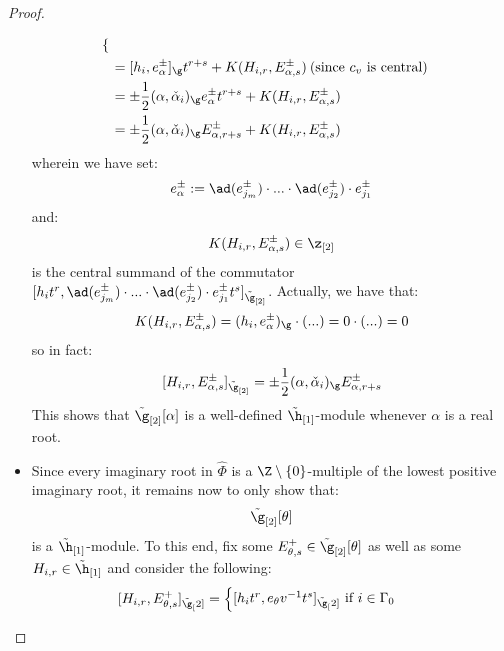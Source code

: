\begin{proof}
\begin{itemize}
$$\begin{aligned}
\begin{cases}
                                \end{cases}
                                \\
                                & = [ h_i, e_{\alpha}^{\pm} ]_{\g} t^{r + s} + K(H_{i, r}, E_{\alpha, s}^{\pm}) \: \text{(since $c_v$ is central)}
                                \\
                                & = \pm \frac12 (\alpha, \check{\alpha}_i)_{\g} e_{\alpha}^{\pm} t^{r + s} + K(H_{i, r}, E_{\alpha, s}^{\pm})
                                \\
                                & = \pm \frac12 (\alpha, \check{\alpha}_i)_{\g} E_{\alpha, r + s}^{\pm} + K(H_{i, r}, E_{\alpha, s}^{\pm})
                            \end{aligned}
                        $$
                    wherein we have set:
                        $$e_{\alpha}^{\pm} := \ad(e_{j_m}^{\pm}) \cdot ... \cdot \ad(e_{j_2}^{\pm}) \cdot e_{j_1}^{\pm}$$
                    and:
                        $$K(H_{i, r}, E_{\alpha, s}^{\pm}) \in \z_{[2]}$$
                    is the central summand of the commutator $[ h_i t^r, \ad(e_{j_m}^{\pm}) \cdot ... \cdot \ad(e_{j_2}^{\pm}) \cdot e_{j_1}^{\pm} t^s ]_{\tilde{\g}_{[2]}}$. Actually, we have that:
                        $$K(H_{i, r}, E_{\alpha, s}^{\pm}) = (h_i, e_{\alpha}^{\pm})_{\g} \cdot (...) = 0 \cdot (...) = 0$$
                    so in fact:
                        $$[H_{i, r}, E_{\alpha, s}^{\pm}]_{\tilde{\g}_{[2]}} = \pm \frac12 (\alpha, \check{\alpha}_i)_{\g} E_{\alpha, r + s}^{\pm}$$
                    This shows that $\tilde{\g}_{[2]}[\alpha]$ is a well-defined $\tilde{\h}_{[1]}$-module whenever $\alpha$ is a real root. 
                    \item Since every imaginary root in $\hat{\Phi}$ is a $\Z \setminus \{0\}$-multiple of the lowest positive imaginary root, it remains now to only show that:
                        $$\tilde{\g}_{[2]}[\theta]$$
                    is a $\tilde{\h}_{[1]}$-module. To this end, fix some $E_{\theta, s}^+ \in \tilde{\g}_{[2]}[\theta]$ as well as some $H_{i, r} \in \tilde{\h}_{[1]}$ and consider the following:
                        $$
                            \begin{aligned}
                                [H_{i, r}, E_{\theta, s}^+]_{\tilde{\g}_[2]} & =
                                \begin{cases}
                                    \text{$[h_i t^r, e_{\theta} v^{-1} t^s]_{\tilde{\g}_[2]}$ if $i \in \Gamma_0$}

\end{cases}
\end{aligned}$$
\end{itemize}
\end{proof}
